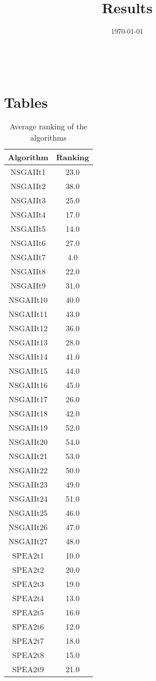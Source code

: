 \documentclass{article}
\title{Results}
\author{}
\date{\today}
\begin{document}
\oddsidemargin 0in \topmargin 0in\maketitle
\
\section{Tables}
\begin{table}[!htp]
\centering
\caption{Average ranking of the algorithms}
\begin{tabular}{c|c}
Algorithm&Ranking\\
\hline
NSGAIIt1&23.0\\
NSGAIIt2&38.0\\
NSGAIIt3&25.0\\
NSGAIIt4&17.0\\
NSGAIIt5&14.0\\
NSGAIIt6&27.0\\
NSGAIIt7&4.0\\
NSGAIIt8&22.0\\
NSGAIIt9&31.0\\
NSGAIIt10&40.0\\
NSGAIIt11&43.0\\
NSGAIIt12&36.0\\
NSGAIIt13&28.0\\
NSGAIIt14&41.0\\
NSGAIIt15&44.0\\
NSGAIIt16&45.0\\
NSGAIIt17&26.0\\
NSGAIIt18&42.0\\
NSGAIIt19&52.0\\
NSGAIIt20&54.0\\
NSGAIIt21&53.0\\
NSGAIIt22&50.0\\
NSGAIIt23&49.0\\
NSGAIIt24&51.0\\
NSGAIIt25&46.0\\
NSGAIIt26&47.0\\
NSGAIIt27&48.0\\
SPEA2t1&10.0\\
SPEA2t2&20.0\\
SPEA2t3&19.0\\
SPEA2t4&13.0\\
SPEA2t5&16.0\\
SPEA2t6&12.0\\
SPEA2t7&18.0\\
SPEA2t8&15.0\\
SPEA2t9&21.0\\

\end{tabular}
\end{table}
\end{document}

